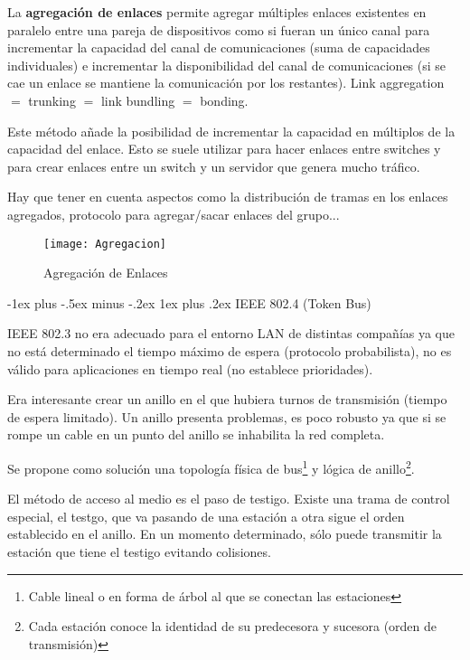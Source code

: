 \documentclass[10pt,portrait, twocolumn]{article}
\makeatletter
\renewcommand{\subsubsection}{\@startsection{subsubsection}{3}{0mm}%
                                {-1ex plus -.5ex minus -.2ex}%
                                {1ex plus .2ex}%
                                {\normalfont\small\bfseries}}
\makeatother
\begin{document}
La \textbf{agregación de enlaces} permite agregar múltiples enlaces existentes en paralelo entre una pareja de dispositivos como si fueran un único canal para incrementar la capacidad del canal de comunicaciones (suma de capacidades individuales) e incrementar la disponibilidad del canal de comunicaciones (si se cae un enlace se mantiene la comunicación por los restantes). Link aggregation $=$ trunking $=$ link bundling $=$ bonding.

\quad Este método añade la posibilidad de incrementar la capacidad en múltiplos de la capacidad del enlace. Esto se suele utilizar para hacer enlaces entre switches y para crear enlaces entre un switch y un servidor que genera mucho tráfico. 

\quad Hay que tener en cuenta aspectos como la distribución de tramas en los enlaces agregados, protocolo para agregar/sacar enlaces del grupo...

\begin{figure}[!ht]	
	\centering
    	\texttt{[image: Agregacion]}
	\caption{Agregación de Enlaces}
\end{figure}  

\subsubsection{IEEE 802.4 (Token Bus)}

IEEE 802.3 no era adecuado para el entorno LAN de distintas compañías ya que no está determinado el tiempo máximo de espera (protocolo probabilista), no es válido para aplicaciones en tiempo real (no establece prioridades).

	\quad Era interesante crear un anillo en el que hubiera turnos de transmisión (tiempo de espera limitado). Un anillo presenta problemas, es poco robusto ya que si se rompe un cable en un punto del anillo se inhabilita la red completa.
	
	\quad Se propone como solución una topología física de bus\footnote{Cable lineal o en forma de árbol al que se conectan las estaciones} y lógica de anillo\footnote{Cada estación conoce la identidad de su predecesora y sucesora (orden de transmisión)}.
	
	\quad El método de acceso al medio es el paso de testigo. Existe una trama de control especial, el testgo, que va pasando de una estación  a otra sigue el orden establecido en el anillo. En un momento determinado, sólo puede transmitir la estación que tiene el testigo evitando colisiones.
	
\end{document}
